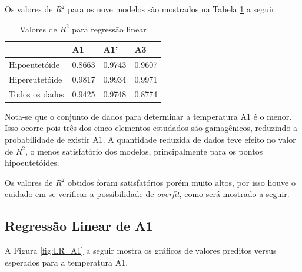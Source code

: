 \documentclass[brazil,tf,epusp]{usp}  %
\begin{document}
Os valores de $R^{2}$ para os nove modelos são mostrados na Tabela \ref{tab:r2_reg_lin} a seguir.

\begin{table}
  \caption{Valores de $R^{2}$ para regressão linear}

  \begin{tabular}{llll}
  \hline
  & A1     & A1'    & A3     \\
  \hline
  Hipoeutetóide  & 0.8663 & 0.9743 & 0.9607 \\
  Hipereutetóide & 0.9817 & 0.9934 & 0.9971 \\
  Todos os dados & 0.9425 & 0.9748 & 0.8774 \\
  \hline
  \end{tabular}

  \label{tab:r2_reg_lin}
\end{table}

Nota-se que o conjunto de dados para determinar a temperatura A1 é o menor. Isso ocorre pois três dos cinco elementos estudados são gamagênicos, reduzindo a probabilidade de existir A1. A quantidade reduzida de dados teve efeito no valor de $R^{2}$, o menos satisfatório dos modelos, principalmente para os pontos hipoeutetóides.

Os valores de $R^{2}$ obtidos foram satisfatórios porém muito altos, por isso houve o cuidado em se verificar a possibilidade de \textit{overfit}, como será mostrado a seguir.

\subsection{Regressão Linear de A1}

A Figura \ref{fig:LR_A1} a seguir mostra os gráficos de valores preditos versus esperados para a temperatura A1.
\end{document}
